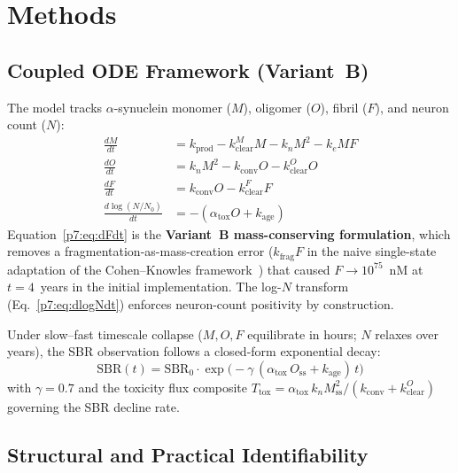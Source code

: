 \section{Methods}
\label{p7:sec:methods}

\subsection*{Coupled ODE Framework (Variant~B)}

The model tracks $\alpha$-synuclein monomer ($M$), oligomer ($O$), fibril ($F$), and neuron count ($N$):
\begin{align}
\frac{dM}{dt} &= k_\text{prod} - k_\text{clear}^M M - k_n M^2 - k_e M F \label{p7:eq:dMdt} \\
\frac{dO}{dt} &= k_n M^2 - k_\text{conv} O - k_\text{clear}^O O \label{p7:eq:dOdt} \\
\frac{dF}{dt} &= k_\text{conv} O - k_\text{clear}^F F \label{p7:eq:dFdt} \\
\frac{d\log(N/N_0)}{dt} &= -(\alpha_\text{tox} O + k_\text{age}) \label{p7:eq:dlogNdt}
\end{align}
Equation~\eqref{p7:eq:dFdt} is the \textbf{Variant~B mass-conserving formulation}, which removes a fragmentation-as-mass-creation error ($k_\text{frag}F$ in the naive single-state adaptation of the Cohen--Knowles framework~\cite{cohen2012,knowles2009}) that caused $F \to 10^{75}$~nM at $t{=}4$~years in the initial implementation. The log-$N$ transform (Eq.~\eqref{p7:eq:dlogNdt}) enforces neuron-count positivity by construction.

Under slow--fast timescale collapse ($M,O,F$ equilibrate in hours; $N$ relaxes over years), the SBR observation follows a closed-form exponential decay:
\begin{equation}
\text{SBR}(t) = \text{SBR}_0 \cdot \exp\bigl(-\gamma\,(\alpha_\text{tox}\,O_\text{ss} + k_\text{age})\,t\bigr)
\label{p7:eq:sbr-decay}
\end{equation}
with $\gamma = 0.7$ and the toxicity flux composite $T_\text{tox} = \alpha_\text{tox}\,k_n M_\text{ss}^2 / (k_\text{conv} + k_\text{clear}^O)$ governing the SBR decline rate.

\subsection*{Structural and Practical Identifiability}

